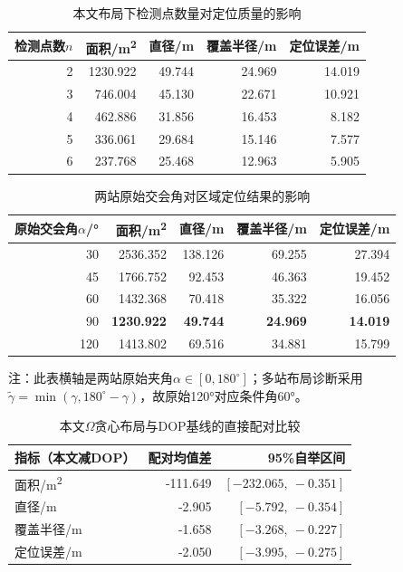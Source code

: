 \begin{table}[htbp]
  \centering
  \caption{本文布局下检测点数量对定位质量的影响}
  \label{tab:p2-number}
  \small
  \begin{tabular}{rrrrr}
    \toprule
    检测点数$n$ & 面积/\si{\metre\squared} & 直径/\si{\metre}
      & 覆盖半径/\si{\metre} & 定位误差/\si{\metre} \\
    \midrule
    2 & 1230.922 & 49.744 & 24.969 & 14.019 \\
    3 & 746.004  & 45.130 & 22.671 & 10.921 \\
    4 & 462.886  & 31.856 & 16.453 & 8.182 \\
    5 & 336.061  & 29.684 & 15.146 & 7.577 \\
    6 & 237.768  & 25.468 & 12.963 & 5.905 \\
    \bottomrule
  \end{tabular}
\end{table}

\begin{table}[htbp]
  \centering
  \caption{两站原始交会角对区域定位结果的影响}
  \label{tab:p2-angle}
  \small
  \begin{tabular}{rrrrr}
    \toprule
    原始交会角$\alpha$/\si{\degree} & 面积/\si{\metre\squared}
      & 直径/\si{\metre} & 覆盖半径/\si{\metre} & 定位误差/\si{\metre} \\
    \midrule
    30  & 2536.352 & 138.126 & 69.255 & 27.394 \\
    45  & 1766.752 & 92.453  & 46.363 & 19.452 \\
    60  & 1432.368 & 70.418  & 35.322 & 16.056 \\
    90  & \textbf{1230.922} & \textbf{49.744} & \textbf{24.969} & \textbf{14.019} \\
    120 & 1413.802 & 69.516  & 34.881 & 15.799 \\
    \bottomrule
  \end{tabular}

  \vspace{1mm}
  \parbox{0.96\linewidth}{\footnotesize 注：此表横轴是两站原始夹角$\alpha\in[0,180^\circ]$；多站布局诊断采用$\widetilde\gamma=\min(\gamma,180^\circ-\gamma)$，故原始120°对应条件角60°。}
\end{table}

\begin{table}[htbp]
  \centering
  \caption{本文$\Omega$贪心布局与DOP基线的直接配对比较}
  \label{tab:p2-dop-direct}
  \small
  \begin{tabular}{lrr}
    \toprule
    指标（本文减DOP） & 配对均值差 & 95\%自举区间 \\
    \midrule
    面积/\si{\metre\squared} & -111.649 & $[-232.065,\ -0.351]$ \\
    直径/\si{\metre} & -2.905 & $[-5.792,\ -0.354]$ \\
    覆盖半径/\si{\metre} & -1.658 & $[-3.268,\ -0.227]$ \\
    定位误差/\si{\metre} & -2.050 & $[-3.995,\ -0.275]$ \\
    \bottomrule
  \end{tabular}
\end{table}
